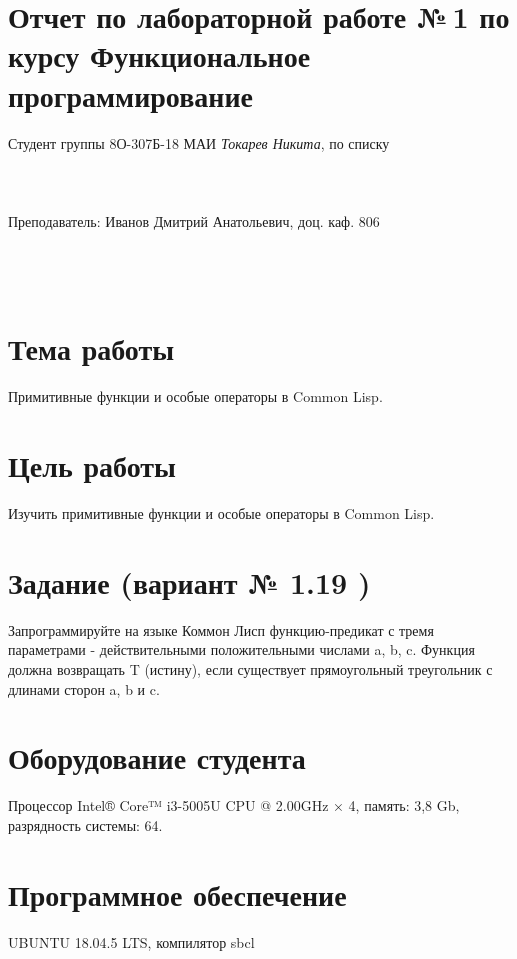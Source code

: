 \documentclass[12pt]{article}
\begin{document}
\section*{Отчет по лабораторной работе №\,1 
по курсу \guillemotleft  Функциональное программирование\guillemotright}
\begin{flushright}
Студент группы 8О-307Б-18 МАИ \textit{Токарев Никита},  по списку \\
 \\
 \\
\ \\
Преподаватель: Иванов Дмитрий Анатольевич, доц. каф. 806 \\
 \\
 \\
 \\

\end{flushright}

\section{Тема работы}
Примитивные функции и особые операторы в Common Lisp.

\section{Цель работы}
Изучить примитивные функции и особые операторы в Common Lisp.

\section{Задание (вариант № 1.19 )}
Запрограммируйте на языке Коммон Лисп функцию-предикат с тремя параметрами - действительными положительными числами a, b, c. Функция должна возвращать T (истину), если существует прямоугольный треугольник с длинами сторон a, b и c.

\section{Оборудование студента}
Процессор Intel® Core™ i3-5005U CPU @ 2.00GHz × 4, память: 3,8 Gb, разрядность системы: 64.

\section{Программное обеспечение}
UBUNTU 18.04.5 LTS, компилятор sbcl
\end{document}
